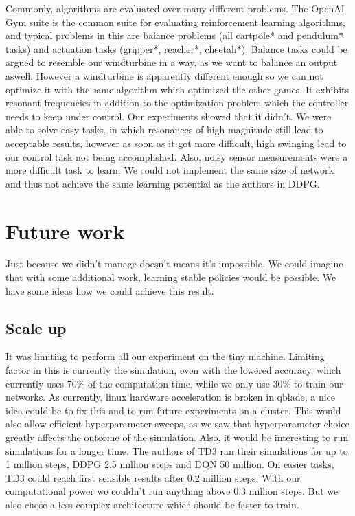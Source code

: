 \documentclass[hyperref,beleg]{cgvpub}
\begin{document}
Commonly, algorithms are evaluated over many different problems. The OpenAI Gym suite is the common suite for evaluating reinforcement learning algorithms, and typical problems in this are balance problems (all cartpole* and pendulum* tasks) and actuation tasks (gripper*, reacher*, cheetah*). Balance tasks could be argued to resemble our windturbine in a way, as we want to balance an output aswell. However a windturbine is apparently different enough so we can not optimize it with the same algorithm which optimized the other games. It exhibits resonant frequencies in addition to the optimization problem which the controller needs to keep under control. Our experiments showed that it didn't. We were able to solve easy tasks, in which resonances of high magnitude still lead to acceptable results, however as soon as it got more difficult, high swinging lead to our control task not being accomplished. Also, noisy sensor measurements were a more difficult task to learn. We could not implement the same size of network and thus not achieve the same learning potential as the authors in \ac{DDPG}.


\chapter{Future work}

Just because we didn't manage doesn't means it's impossible. We could imagine that with some additional work, learning stable policies would be possible. We have some ideas how we could achieve this result.

\section{Scale up}

It was limiting to perform all our experiment on the tiny machine. Limiting factor in this is currently the simulation, even with the lowered accuracy, which currently uses 70\% of the computation time, while we only use 30\% to train our networks. As currently, linux hardware acceleration is broken in qblade, a nice idea could be to fix this and to run future experiments on a cluster. This would also allow efficient hyperparameter sweeps, as we saw that hyperparameter choice greatly affects the outcome of the simulation. Also, it would be interesting to run simulations for a longer time. The authors of \ac{TD3} ran their simulations for up to 1 million steps, \ac{DDPG} 2.5 million steps and \ac{DQN} 50 million. On easier tasks, TD3 could reach first sensible results after 0.2 million steps. With our computational power we couldn't run anything above 0.3 million steps. But we also chose a less complex architecture which should be faster to train.
\end{document}
